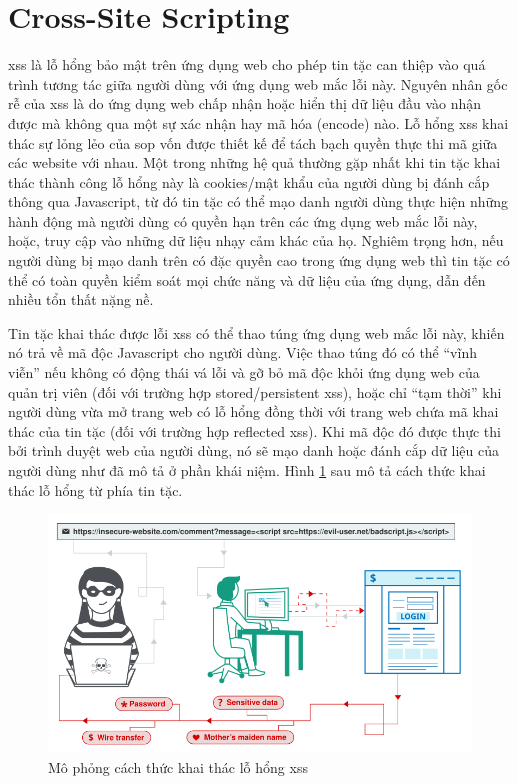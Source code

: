 \section{Cross-Site Scripting}
\acrfull{xss} \parencite{sullivan2011web,owasp-xss,portswigger-xss,li2011survey} là lỗ hổng bảo mật trên ứng dụng web cho phép tin tặc can thiệp vào quá trình tương tác giữa người dùng với ứng dụng web mắc lỗi này. Nguyên nhân gốc rễ của \acrshort{xss} là do ứng dụng web chấp nhận hoặc hiển thị dữ liệu đầu vào nhận được mà không qua một sự xác nhận hay mã hóa (encode) nào. Lỗ hổng \acrshort{xss} khai thác sự lỏng lẻo của \acrshort{sop} vốn được thiết kế để tách bạch quyền thực thi mã giữa các website với nhau. Một trong những hệ quả thường gặp nhất khi tin tặc khai thác thành công lỗ hổng này là cookies/mật khẩu của người dùng bị đánh cắp thông qua Javascript, từ đó tin tặc có thể mạo danh người dùng thực hiện những hành động mà người dùng có quyền hạn trên các ứng dụng web mắc lỗi này, hoặc, truy cập vào những dữ liệu nhạy cảm khác của họ. Nghiêm trọng hơn, nếu người dùng bị mạo danh trên có đặc quyền cao trong ứng dụng web thì tin tặc có thể có toàn quyền kiểm soát mọi chức năng và dữ liệu của ứng dụng, dẫn đến nhiều tổn thất nặng nề. \par
Tin tặc khai thác được lỗi \acrshort{xss} có thể thao túng ứng dụng web mắc lỗi này, khiến nó trả về mã độc Javascript cho người dùng. Việc thao túng đó có thể ``vĩnh viễn'' nếu không có động thái vá lỗi và gỡ bỏ mã độc khỏi ứng dụng web của quản trị viên (đối với trường hợp stored/persistent \acrshort{xss}), hoặc chỉ ``tạm thời'' khi người dùng vừa mở trang web có lỗ hổng đồng thời với trang web chứa mã khai thác của tin tặc (đối với trường hợp reflected \acrshort{xss}). Khi mã độc đó được thực thi bởi trình duyệt web của người dùng, nó sẽ mạo danh hoặc đánh cắp dữ liệu của người dùng như đã mô tả ở phần khái niệm. Hình \ref{fig:xss-concept} sau mô tả cách thức khai thác lỗ hổng từ phía tin tặc.
\begin{figure}[H]
  \centering
    \includegraphics[width=\textwidth,keepaspectratio=true]{images/xss-concept.png}
  \caption[Mô phỏng cách thức khai thác lỗ hổng XSS]{Mô phỏng cách thức khai thác lỗ hổng \acrshort{xss} \parencite{portswigger-xss}}
  \label{fig:xss-concept}
\end{figure}
